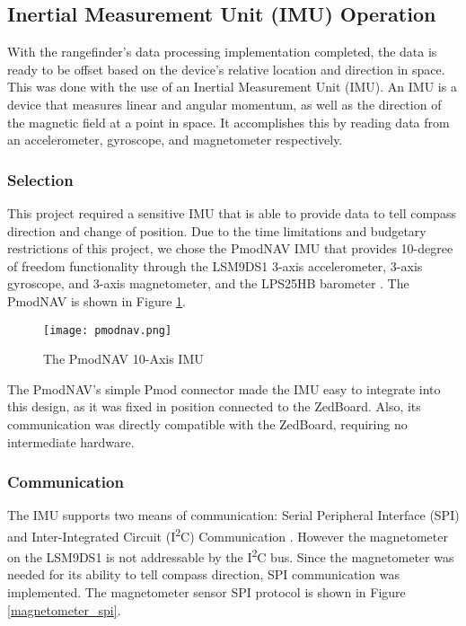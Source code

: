 \subsection{Inertial Measurement Unit (IMU) Operation}
With the rangefinder's data processing implementation completed, the data is ready to be offset based on the device's relative location and direction in space. This was done with the use of an Inertial Measurement Unit (IMU). An IMU is a device that measures linear and angular momentum, as well as the direction of the magnetic field at a point in space. It accomplishes this by reading data from an accelerometer, gyroscope, and magnetometer respectively. 

\subsubsection{Selection}
This project required a sensitive IMU that is able to provide data to tell compass direction and change of position. Due to the time limitations and budgetary restrictions of this project, we chose the PmodNAV IMU that provides 10-degree of freedom functionality through the LSM9DS1 3-axis accelerometer, 3-axis gyroscope, and 3-axis magnetometer, and the LPS25HB barometer \cite{lsm9ds1, lps25hd}. The PmodNAV is shown in Figure \ref{pmodnav}.

\begin{figure}[H]
	\centerline{\texttt{[image: pmodnav.png]}}
	\caption{The PmodNAV 10-Axis IMU \cite{pmodnav_ref}}
	\label{pmodnav}
\end{figure}

The PmodNAV's simple Pmod connector made the IMU easy to integrate into this design, as it was fixed in position connected to the ZedBoard. Also, its communication was directly compatible with the ZedBoard, requiring no intermediate hardware.

\subsubsection{Communication}
The IMU supports two means of communication: Serial Peripheral Interface (SPI) and Inter-Integrated Circuit (I\textsuperscript{2}C) Communication \cite{lsm9ds1}. However the magnetometer on the LSM9DS1 is not addressable by the I\textsuperscript{2}C bus. Since the magnetometer was needed for its ability to tell compass direction, SPI communication was implemented. The magnetometer sensor SPI protocol is shown in Figure \ref{magnetometer_spi}.

